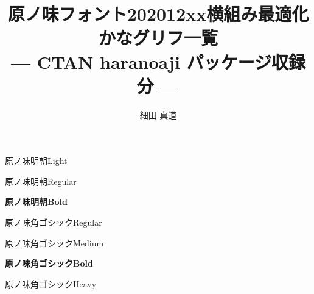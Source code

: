 \documentclass[dvipdfmx]{jsarticle}
\title{原ノ味フォント202012xx横組み最適化かなグリフ一覧\\
--- CTAN haranoaji パッケージ収録分 ---}
\author{細田 真道}
\begin{document}
\maketitle


\clearpage
\parindent=0pt
\fboxsep=0pt

\mcfamily\ltseries
{\huge 原ノ味明朝\textmd{Light}}

\testAll

\clearpage

\mcfamily\mdseries
{\huge 原ノ味明朝\textmd{Regular}}

\testAll

\clearpage

\mcfamily\bfseries
{\huge 原ノ味明朝\textmd{Bold}}

\testAll

\clearpage

\gtfamily\mdseries
{\huge 原ノ味角ゴシック\textmd{Regular}}

\testAll

\clearpage

\mgfamily %
{\huge 原ノ味角ゴシック\textmd{Medium}}

\testAll

\clearpage

\gtfamily\bfseries
{\huge 原ノ味角ゴシック\textmd{Bold}}

\testAll

\clearpage

\gtfamily\ebseries
{\huge 原ノ味角ゴシック\textmd{Heavy}}

\testAll
\end{document}
